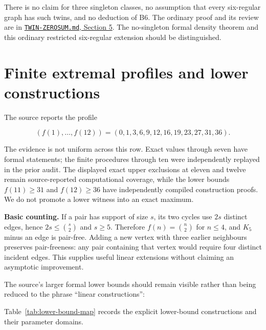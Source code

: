 \documentclass[smallextended]{svjour3}
\begin{document}
There is no claim for three singleton classes, no assumption that every
six-regular graph has such twins, and no deduction of B6. The ordinary
proof and its review are in
\href{https://github.com/roberthuynh/erdos-585/blob/1efc324e155ef0b6a7081c5f695c6c825e7debef/findings/supplement/papers/twin-core/TWIN-ZEROSUM.md}{\texttt{TWIN-ZEROSUM.md},
Section 5}. The no-singleton formal density theorem and this ordinary
restricted six-regular extension should be distinguished.

\section{Finite extremal profiles and lower
constructions}\label{finite-extremal-profiles-and-lower-constructions}

The source reports the profile

\[
(f(1),\ldots,f(12))=(0,1,3,6,9,12,16,19,23,27,31,36).
\]

The evidence is not uniform across this row. Exact values through seven
have formal statements; the finite procedures through ten were
independently replayed in the prior audit. The displayed exact upper
exclusions at eleven and twelve remain source-reported computational
coverage, while the lower bounds \(f(11)\geq31\) and \(f(12)\geq36\)
have independently compiled construction proofs. We do not promote a
lower witness into an exact maximum.

\textbf{Basic counting.} If a pair has support of size \(s\), its two
cycles use \(2s\) distinct edges, hence \(2s\leq\binom{s}{2}\) and
\(s\geq5\). Therefore \(f(n)=\binom n2\) for \(n\leq4\), and \(K_5\)
minus an edge is pair-free. Adding a new vertex with three earlier
neighbours preserves pair-freeness: any pair containing that vertex
would require four distinct incident edges. This supplies useful linear
extensions without claiming an asymptotic improvement.

The source's larger formal lower bounds should remain visible rather
than being reduced to the phrase ``linear constructions'':

Table~\ref{tab:lower-bound-map} records the explicit lower-bound constructions and their parameter domains.
\end{document}
